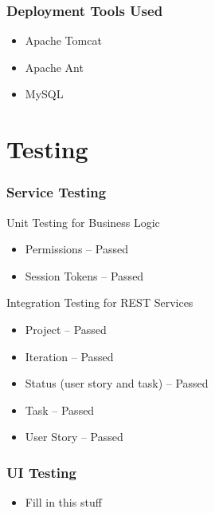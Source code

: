 \documentclass[final]{beamer}
\begin{document}
\begin{frame}
	\frametitle{Deployment Tools Used}
	\begin{beamerboxesrounded}[shadow]{}
		\begin{itemize}
			\item{Apache Tomcat}
			\item{Apache Ant}
			\item{MySQL}
		\end{itemize}
	\end{beamerboxesrounded}
\end{frame}


\section{Testing}

\begin{frame}
	\frametitle{Service Testing}
	\begin{beamerboxesrounded}[shadow]{Unit Testing for Business Logic}
		\begin{itemize}
			\item{Permissions -- Passed}
			\item{Session Tokens -- Passed}
		\end{itemize}
	\end{beamerboxesrounded}

	\begin{beamerboxesrounded}[shadow]{Integration Testing for REST Services}
		\begin{itemize}
			\item{Project -- Passed}
			\item{Iteration -- Passed}
			\item{Status (user story and task) -- Passed}
			\item{Task -- Passed}
			\item{User Story -- Passed}
		\end{itemize}
	\end{beamerboxesrounded}
\end{frame}

\begin{frame}
	\frametitle{UI Testing}
	\begin{beamerboxesrounded}[shadow]{}
		\begin{itemize}
			\item{Fill in this stuff}
		\end{itemize}
	\end{beamerboxesrounded}
\end{frame}
\end{document}
